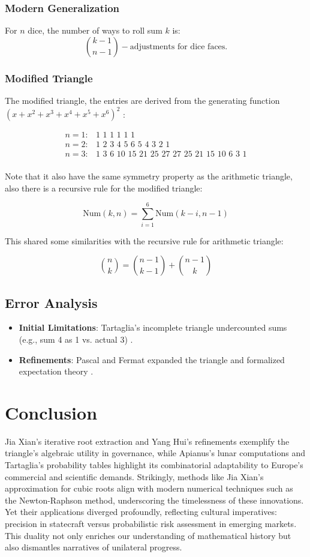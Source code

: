 \documentclass{article}
\begin{document}
\subsubsection{Modern Generalization}
For \(n\) dice, the number of ways to roll sum \(k\) is:
\[
\binom{k - 1}{n - 1} - \text{adjustments for dice faces}.
\]

\subsubsection{Modified Triangle}

The modified triangle, the entries are derived from the generating function $(x+x^2+x^3+x^4+x^5+x^6)^2$ :

\begin{align*}
    n=1:& \text{1 1 1 1 1 1}\\
n=2:& \text{1 2 3 4 5 6 5 4 3 2 1}\\
n=3:& \text{1 3 6 10 15 21 25 27 27 25 21 15 10 6 3 1}\\
\end{align*}

Note that it also have the same symmetry property as the arithmetic triangle, also there is a recursive rule for the modified triangle:

\[
\text{Num}(k,n)=\sum^{6}_{i=1}\text{Num}(k-i,n-1)
\]

This shared some similarities with the recursive rule for arithmetic triangle:

\[
\binom{n}{k}=\binom{n-1}{k-1}+\binom{n-1}{k}
\]

\subsection{Error Analysis}
\begin{itemize}
\item \textbf{Initial Limitations}: Tartaglia's incomplete triangle undercounted sums (e.g., sum 4 as 1 vs. actual 3) \citep{tartaglia1556}.
\item \textbf{Refinements}: Pascal and Fermat expanded the triangle and formalized expectation theory \citep{pascal1654}.
\end{itemize}

\section{Conclusion}

Jia Xian’s iterative root extraction and Yang Hui’s refinements exemplify the triangle’s algebraic utility in governance, while Apianus’s lunar computations and Tartaglia’s probability tables highlight its combinatorial adaptability to Europe’s commercial and scientific demands. Strikingly, methods like Jia Xian’s approximation for cubic roots align with modern numerical techniques such as the Newton-Raphson method, underscoring the timelessness of these innovations. Yet their applications diverged profoundly, reflecting cultural imperatives: precision in statecraft versus probabilistic risk assessment in emerging markets. This duality not only enriches our understanding of mathematical history but also dismantles narratives of unilateral progress.
\end{document}
